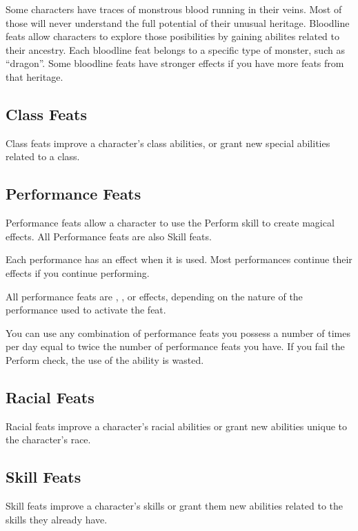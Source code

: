         Some characters have traces of monstrous blood running in their veins.
        Most of those will never understand the full potential of their unusual heritage.
        Bloodline feats allow characters to explore those posibilities by gaining abilites related to their ancestry.
        Each bloodline feat belongs to a specific type of monster, such as ``dragon''.
        Some bloodline feats have stronger effects if you have more feats from that heritage.

    \subsection{Class Feats}
        Class feats improve a character's class abilities, or grant new special abilities related to a class.

    \subsection{Performance Feats}\label{Performance Feats}
        Performance feats allow a character to use the Perform skill to create magical effects.
        All Performance feats are also Skill feats.

        Each performance has an effect when it is used.
        Most performances continue their effects if you continue performing.

        All performance feats are , , or  effects, depending on the nature of the performance used to activate the feat.

        You can use any combination of performance feats you possess a number of times per day equal to twice the number of performance feats you have.
        If you fail the Perform check, the use of the ability is wasted.

    \subsection{Racial Feats}\label{Racial Feats}
        Racial feats improve a character's racial abilities or grant new abilities unique to the character's race.

    \subsection{Skill Feats}
        Skill feats improve a character's skills or grant them new abilities related to the skills they already have.

